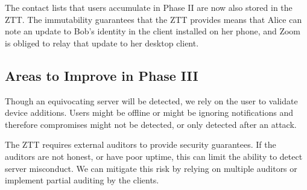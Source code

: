 The contact lists that users accumulate in Phase II are now also stored in the ZTT. The immutability guarantees that the ZTT provides means that Alice can note an update to Bob's identity in the client installed on her phone, and Zoom is obliged to relay that update to her desktop client.

\subsection{Areas to Improve in Phase III}

Though an equivocating server will be detected, we rely on the user to validate device additions. Users might be offline or might be ignoring notifications and therefore compromises might not be detected, or only detected after an attack.

The ZTT requires external auditors to provide security guarantees. If the auditors are not honest, or have poor uptime, this can limit the ability to detect server misconduct. We can mitigate this risk by relying on multiple auditors or implement partial auditing by the clients.
